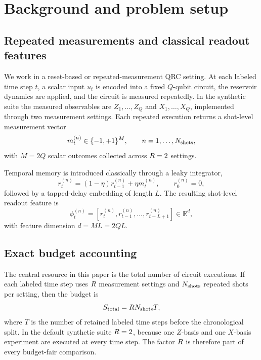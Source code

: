 \section{Background and problem setup}
\label{sec:background}

\subsection{Repeated measurements and classical readout features}

We work in a reset-based or repeated-measurement QRC setting. At each labeled time step $t$, a scalar input $u_t$ is encoded into a fixed $Q$-qubit circuit, the reservoir dynamics are applied, and the circuit is measured repeatedly. In the synthetic suite the measured observables are $Z_1,\dots,Z_Q$ and $X_1,\dots,X_Q$, implemented through two measurement settings. Each repeated execution returns a shot-level measurement vector
\begin{equation}
m_t^{(n)} \in \{-1,+1\}^{M}, \qquad n=1,\dots,N_{\mathrm{shots}},
\end{equation}
with $M=2Q$ scalar outcomes collected across $R=2$ settings.

Temporal memory is introduced classically through a leaky integrator,
\begin{equation}
r_t^{(n)} = (1-\eta)r_{t-1}^{(n)} + \eta m_t^{(n)}, \qquad r_0^{(n)}=0,
\label{eq:leaky}
\end{equation}
followed by a tapped-delay embedding of length $L$. The resulting shot-level readout feature is
\begin{equation}
\phi_t^{(n)} = [r_t^{(n)},r_{t-1}^{(n)},\dots,r_{t-L+1}^{(n)}] \in \mathbb{R}^{d},
\end{equation}
with feature dimension $d = ML = 2QL$.

\subsection{Exact budget accounting}

The central resource in this paper is the total number of circuit executions. If each labeled time step uses $R$ measurement settings and $N_{\mathrm{shots}}$ repeated shots per setting, then the budget is
\begin{equation}
S_{\mathrm{total}} = R N_{\mathrm{shots}} T,
\label{eq:budget}
\end{equation}
where $T$ is the number of retained labeled time steps before the chronological split. In the default synthetic suite $R=2$, because one $Z$-basis and one $X$-basis experiment are executed at every time step. The factor $R$ is therefore part of every budget-fair comparison.


